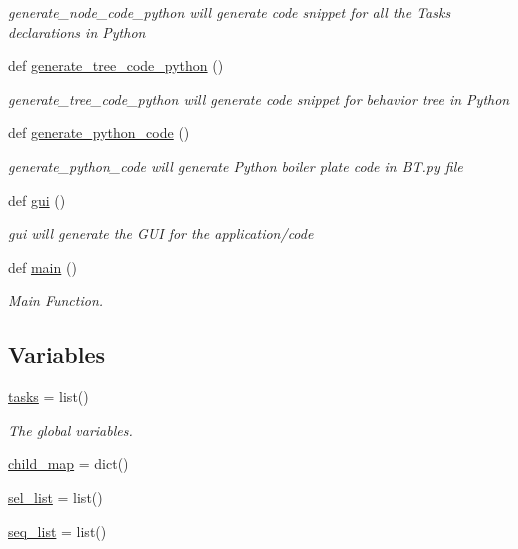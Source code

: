 \begin{DoxyCompactItemize}
\begin{DoxyCompactList}\small\item\em \textquotesingle{}generate\+\_\+node\+\_\+code\+\_\+python\textquotesingle{} will generate code snippet for all the Tasks declarations in Python \end{DoxyCompactList}\item 
def \mbox{\hyperlink{namespace_b_t_code_generator_a523762833b2b5d5518009ec1b8532622}{generate\+\_\+tree\+\_\+code\+\_\+python}} ()
\begin{DoxyCompactList}\small\item\em \textquotesingle{}generate\+\_\+tree\+\_\+code\+\_\+python\textquotesingle{} will generate code snippet for behavior tree in Python \end{DoxyCompactList}\item 
def \mbox{\hyperlink{namespace_b_t_code_generator_af49b1d39052f0122b97e331871bdbd79}{generate\+\_\+python\+\_\+code}} ()
\begin{DoxyCompactList}\small\item\em \textquotesingle{}generate\+\_\+python\+\_\+code\textquotesingle{} will generate Python boiler plate code in \textquotesingle{}B\+T.\+py\textquotesingle{} file \end{DoxyCompactList}\item 
def \mbox{\hyperlink{namespace_b_t_code_generator_a10876a9127f1dad77758153042f26dc9}{gui}} ()
\begin{DoxyCompactList}\small\item\em \textquotesingle{}gui\textquotesingle{} will generate the G\+UI for the application/code \end{DoxyCompactList}\item 
def \mbox{\hyperlink{namespace_b_t_code_generator_a6f3ec802a945edfd8094611d24abeb16}{main}} ()
\begin{DoxyCompactList}\small\item\em Main Function. \end{DoxyCompactList}\end{DoxyCompactItemize}
\subsection*{Variables}
\begin{DoxyCompactItemize}
\item 
\mbox{\hyperlink{namespace_b_t_code_generator_a32980cdc2e7047f834b5988eea9426a1}{tasks}} = list()
\begin{DoxyCompactList}\small\item\em The global variables. \end{DoxyCompactList}\item 
\mbox{\hyperlink{namespace_b_t_code_generator_a3c9566f03efe132c7c0f4ff5f918950e}{child\+\_\+map}} = dict()
\item 
\mbox{\hyperlink{namespace_b_t_code_generator_a254de4b3426d1304e8507f7817f3a7ad}{sel\+\_\+list}} = list()
\item 
\mbox{\hyperlink{namespace_b_t_code_generator_a966464d740a003b5d0487229396d3c86}{seq\+\_\+list}} = list()
\end{DoxyCompactItemize}


